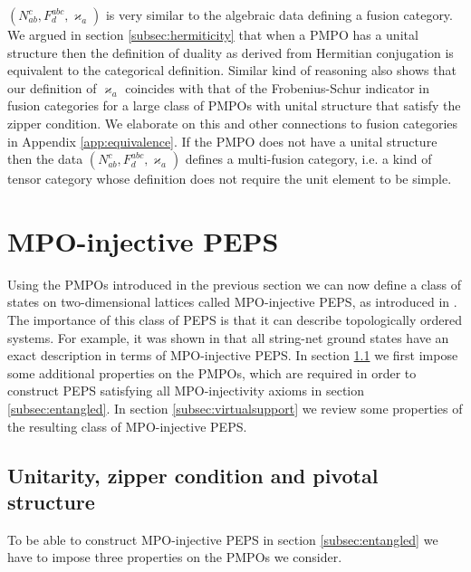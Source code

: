 \documentclass[12 pt]{article}
\begin{document}
$(N_{ab}^c, F^{abc}_d, \varkappa_a)$ is very similar to the algebraic data defining a fusion category. We argued in section \ref{subsec:hermiticity} that when a PMPO has a unital structure then the definition of duality as derived from Hermitian conjugation is equivalent to the categorical definition.
Similar kind of reasoning also shows that our definition of $\varkappa_a$ coincides with that of the Frobenius-Schur indicator in fusion categories for a large class of PMPOs with unital structure that satisfy the zipper condition. We elaborate on this and other connections to fusion categories in Appendix \ref{app:equivalence}. If the PMPO does not have a unital structure then the data $(N_{ab}^c, F^{abc}_d, \varkappa_a)$ defines a multi-fusion category, i.e. a kind of tensor category whose definition does not require the unit element to be simple.

\section{MPO-injective PEPS} \label{sec:MPOinjPEPS}

Using the PMPOs introduced in the previous section we can now define a class of states on two-dimensional lattices called MPO-injective PEPS, as introduced in \cite{Ginjectivity,Buerschaper14,MPOpaper}. The importance of this class of PEPS is that it can describe topologically ordered systems. For example, it was shown in \cite{MPOpaper} that all string-net ground states have an exact description in terms of MPO-injective PEPS. In section \ref{subsec:zipper} we first impose some additional properties on the PMPOs, which are required in order to construct PEPS satisfying all MPO-injectivity axioms in section \ref{subsec:entangled}. In section \ref{subsec:virtualsupport} we review some properties of the resulting class of MPO-injective PEPS.

\subsection{Unitarity, zipper condition and pivotal structure}\label{subsec:zipper}
To be able to construct MPO-injective PEPS in section \ref{subsec:entangled} we have to impose three properties on the PMPOs we consider.
\end{document}
